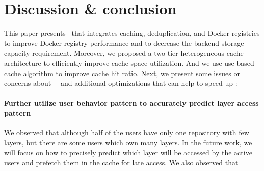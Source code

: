 \section{Discussion \& conclusion}

This paper presents \sysname~that integrates caching, deduplication, and Docker registries to
improve Docker registry performance and to decrease the backend storage capacity requirement. 
Moreover, we proposed a two-tier heterogeneous cache architecture to efficiently improve cache space 
utilization. And we use use-based cache algorithm to improve cache hit ratio.
Next, we present some issues or concerns about~\sysname~
and additional optimizations that can help to speed up \sysname:

\paragraph{Further utilize user behavior pattern to accurately predict layer access pattern }
We observed that although half of the users have only one repository with few layers, but there are some users which own many layers. In the future work, we will focus on how to precisely predict which layer will be accessed by the active users and prefetch them in the cache for late access.
We also observed that 

